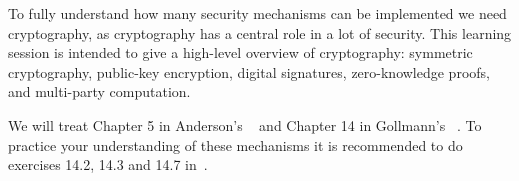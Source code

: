 To fully understand how many security mechanisms can be implemented we need 
cryptography, as cryptography has a central role in a lot of security.
This learning session is intended to give a high-level overview of 
cryptography: symmetric cryptography, public-key encryption, digital 
signatures, zero-knowledge proofs, and multi-party computation.

We will treat
Chapter 5 in Anderson's ~\cite{Anderson2008sea} and
Chapter 14 in Gollmann's ~\cite{Gollmann2011cs}.
To practice your understanding of these mechanisms it is recommended to do 
exercises 14.2, 14.3 and 14.7 in~\cite{Gollmann2011cs}.
